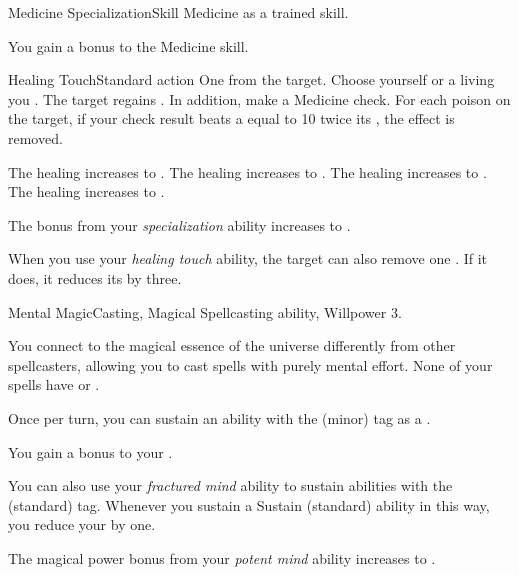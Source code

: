   \begin{feat}{Medicine Specialization}{Skill}
    \featpre Medicine as a trained skill.

     You gain a  bonus to the Medicine skill.

    \begin{activeability}{Healing Touch}{Standard action}
      \abilitycost One  from the target.
      \rankline
      Choose yourself or a living  you .
      The target regains \hprankfivelow.
      In addition, make a Medicine check.
      For each poison on the target, if your check result beats a  equal to 10 \add twice its , the effect is removed.

      \rankline
       The healing increases to \hpranksixlow.
       The healing increases to \hpranksevenlow.
       The healing increases to \hprankeightlow.
       The healing increases to \hprankninelow.
    \end{activeability}

     The bonus from your \textit{specialization} ability increases to .

     When you use your \textit{healing touch} ability, the target can also remove one .
    If it does, it reduces its  by three.
  \end{feat}

  \begin{magicalfeat}{Mental Magic}{Casting, Magical}
    \featpre Spellcasting ability, Willpower 3.

     You connect to the magical essence of the universe differently from other spellcasters, allowing you to cast spells with purely mental effort.
    None of your spells have  or .

     Once per turn, you can sustain an ability with the  (minor) tag as a .

     You gain a  bonus to your .

     You can also use your \textit{fractured mind} ability to sustain abilities with the  (standard) tag.
    Whenever you sustain a Sustain (standard) ability in this way, you reduce your  by one.

     The magical power bonus from your \textit{potent mind} ability increases to .
  \end{magicalfeat}

